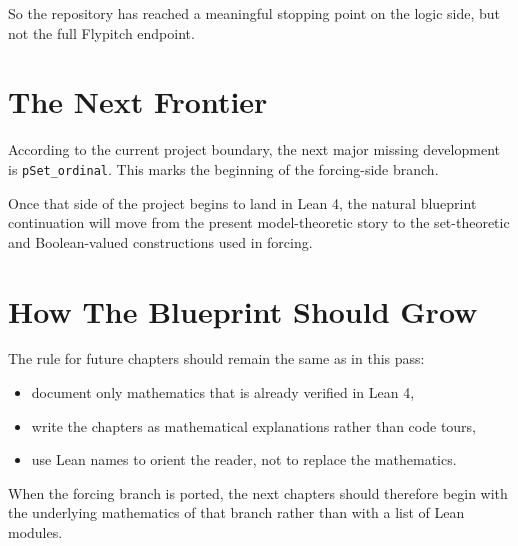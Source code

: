 So the repository has reached a meaningful stopping point on the logic side,
but not the full Flypitch endpoint.

\section{The Next Frontier}

According to the current project boundary, the next major missing development is
\texttt{pSet\_ordinal}. This marks the beginning of the forcing-side branch.

Once that side of the project begins to land in Lean 4, the natural blueprint
continuation will move from the present model-theoretic story to the
set-theoretic and Boolean-valued constructions used in forcing.

\section{How The Blueprint Should Grow}

The rule for future chapters should remain the same as in this pass:

\begin{itemize}
\item document only mathematics that is already verified in Lean 4,
\item write the chapters as mathematical explanations rather than code tours,
\item use Lean names to orient the reader, not to replace the mathematics.
\end{itemize}

When the forcing branch is ported, the next chapters should therefore begin
with the underlying mathematics of that branch rather than with a list of Lean
modules.
